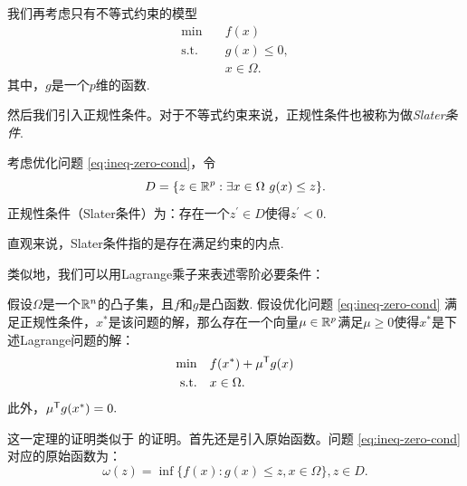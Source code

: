 我们再考虑只有不等式约束的模型
\begin{equation}
    \begin{aligned}
    \min\quad & f({x})\\
    \text{s.t.}\quad& {g(x)\le 0},\\
    &{x}\in\Omega.
\end{aligned}\label{eq:ineq-zero-cond}
\end{equation}
其中，${g}$是一个$p$维的函数. 


然后我们引入正规性条件。对于不等式约束来说，正规性条件也被称为做\emph{Slater条件}. 

\begin{definition}[Slater条件]
考虑优化问题 \eqref{eq:ineq-zero-cond}，令
\[D=\{z\in \mathbb{R}^p:\exists x\in\Omega\ {g(x)\le z}\}.\]
正规性条件（Slater条件）为：存在一个$z^\prime\in D$使得$z^\prime<0$. 
\end{definition}
直观来说，Slater条件指的是存在满足约束的内点.

类似地，我们可以用Lagrange乘子来表述零阶必要条件：
\begin{theorem}\label{thm:ineq-zero-cond}
假设$\Omega$是一个$\mathbb{R}^n$的凸子集，且$f$和${g}$是凸函数. 假设优化问题 \eqref{eq:ineq-zero-cond} 满足正规性条件，${x^\ast}$是该问题的解，那么存在一个向量${\mu}\in \mathbb{R}^p$满足$\mu\ge 0$使得${x^\ast}$是下述Lagrange问题的解：
\begin{align*}
\min\quad &f({x^\ast})+\mu^{\mathsf{T}} g(x)\\
\text{s.t.}\quad& x\in\Omega.
\end{align*}
此外，${\mu^{\mathsf{T}} g(x^\ast)}=0.$
\end{theorem}

这一定理的证明类似于 的证明。首先还是引入原始函数。问题 \eqref{eq:ineq-zero-cond} 对应的原始函数为：
    $$\omega({z})=\inf\{f({x}):g(x)\le{z},x\in\Omega\},z\in D.$$


